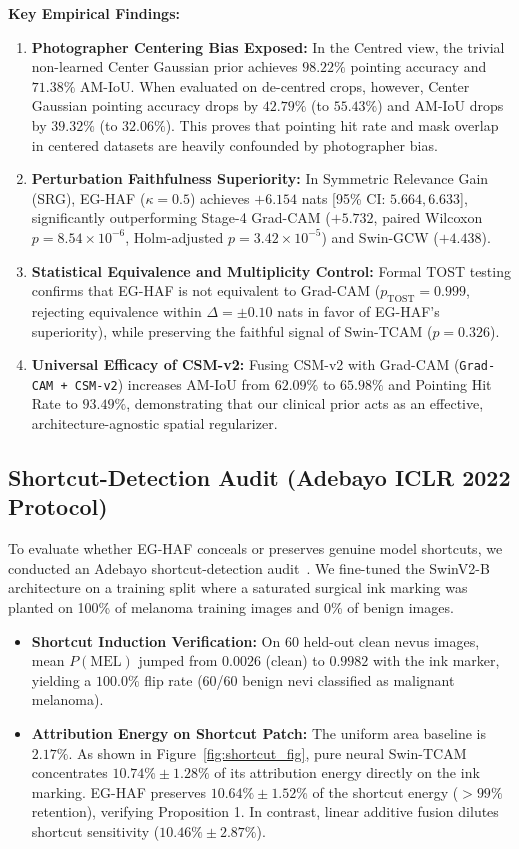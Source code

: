 \documentclass[11pt,a4paper]{article}
\begin{document}
\textbf{Key Empirical Findings:}
\begin{enumerate}
    \item \textbf{Photographer Centering Bias Exposed:} In the Centred view, the trivial non-learned Center Gaussian prior achieves $98.22\%$ pointing accuracy and $71.38\%$ AM-IoU. When evaluated on de-centred crops, however, Center Gaussian pointing accuracy drops by $42.79\%$ (to $55.43\%$) and AM-IoU drops by $39.32\%$ (to $32.06\%$). This proves that pointing hit rate and mask overlap in centered datasets are heavily confounded by photographer bias.
    \item \textbf{Perturbation Faithfulness Superiority:} In Symmetric Relevance Gain (SRG), EG-HAF ($\kappa=0.5$) achieves $+6.154$ nats [95\% CI: $5.664, 6.633$], significantly outperforming Stage-4 Grad-CAM ($+5.732$, paired Wilcoxon $p = 8.54 \times 10^{-6}$, Holm-adjusted $p = 3.42 \times 10^{-5}$) and Swin-GCW ($+4.438$).
    \item \textbf{Statistical Equivalence and Multiplicity Control:} Formal TOST testing confirms that EG-HAF is not equivalent to Grad-CAM ($p_{\text{TOST}} = 0.999$, rejecting equivalence within $\Delta = \pm 0.10$ nats in favor of EG-HAF's superiority), while preserving the faithful signal of Swin-TCAM ($p = 0.326$).
    \item \textbf{Universal Efficacy of CSM-v2:} Fusing CSM-v2 with Grad-CAM (\texttt{Grad-CAM + CSM-v2}) increases AM-IoU from $62.09\%$ to $65.98\%$ and Pointing Hit Rate to $93.49\%$, demonstrating that our clinical prior acts as an effective, architecture-agnostic spatial regularizer.
\end{enumerate}

\subsection{Shortcut-Detection Audit (Adebayo ICLR 2022 Protocol)}
\label{sec:res_shortcut}
To evaluate whether EG-HAF conceals or preserves genuine model shortcuts, we conducted an Adebayo shortcut-detection audit~\cite{adebayo2022post}. We fine-tuned the SwinV2-B architecture on a training split where a saturated surgical ink marking was planted on 100\% of melanoma training images and 0\% of benign images.
\begin{itemize}
    \item \textbf{Shortcut Induction Verification:} On 60 held-out clean nevus images, mean $P(\text{MEL})$ jumped from $0.0026$ (clean) to $0.9982$ with the ink marker, yielding a $100.0\%$ flip rate (60/60 benign nevi classified as malignant melanoma).
    \item \textbf{Attribution Energy on Shortcut Patch:} The uniform area baseline is $2.17\%$. As shown in Figure~\ref{fig:shortcut_fig}, pure neural Swin-TCAM concentrates $10.74\% \pm 1.28\%$ of its attribution energy directly on the ink marking. EG-HAF preserves $10.64\% \pm 1.52\%$ of the shortcut energy ($> 99\%$ retention), verifying Proposition 1. In contrast, linear additive fusion dilutes shortcut sensitivity ($10.46\% \pm 2.87\%$).
\end{itemize}
\end{document}
